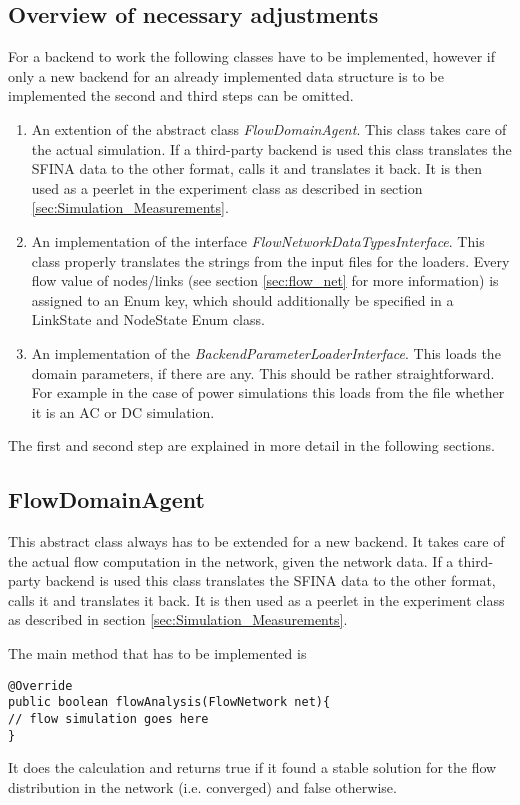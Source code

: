 \documentclass[11pt,fleqn]{book} %
\newcommand{\backend}[1][]{backend#1}
\newcommand{\backendparameters}{domain parameters}
\newcommand{\BackendParameterLoader}{BackendParameterLoader}
\begin{document}
\subsection{Overview of necessary adjustments}
For a \backend{} to work the following classes have to be implemented, however if only a new \backend{} for an already implemented data structure is to be implemented the second and third steps can be omitted.
\begin{enumerate}
	\item An extention of the abstract class \textit{FlowDomainAgent}. This class takes care of the actual simulation. If a third-party \backend{} is used this class translates the SFINA data to the other format, calls it and translates it back. It is then used as a peerlet in the experiment class as described in section \ref{sec:Simulation_Measurements}.
	\item An implementation of the interface \textit{FlowNetworkDataTypesInterface}. This class properly translates the strings from the input files for the loaders. Every flow value of nodes/links (see section \ref{sec:flow_net} for more information) is assigned to an Enum key, which should additionally be specified in a LinkState and NodeState Enum class. 
	\item An implementation of the \textit{\BackendParameterLoader Interface}. This loads the \backendparameters{}, if there are any. This should be rather straightforward. For example in the case of power simulations this loads from the file whether it is an AC or DC simulation. 
\end{enumerate}

The first and second step are explained in more detail in the following sections.

\subsection{FlowDomainAgent}
This abstract class always has to be extended for a new \backend{}. It takes care of the actual flow computation in the network, given the network data. If a third-party \backend{} is used this class translates the SFINA data to the other format, calls it and translates it back. It is then used as a peerlet in the experiment class as described in section \ref{sec:Simulation_Measurements}.

The main method that has to be implemented is 
\begin{lstlisting}[frame=single]
@Override
public boolean flowAnalysis(FlowNetwork net){
// flow simulation goes here    
}
\end{lstlisting}
It does the calculation and returns true if it found a stable solution for the flow distribution in the network (i.e. converged) and false otherwise.
\end{document}
